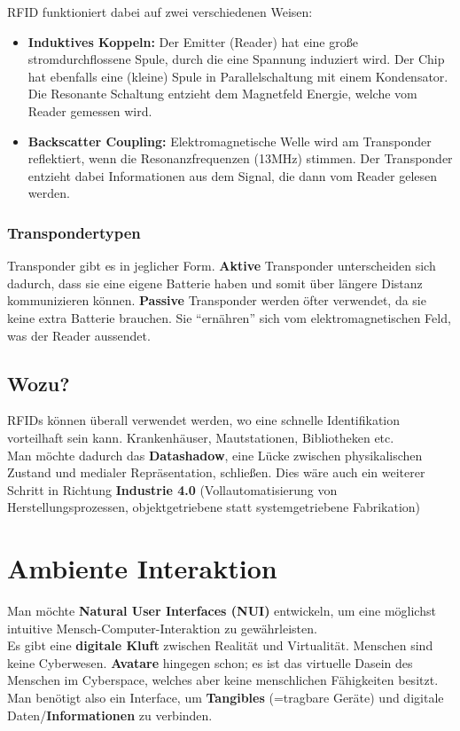 \documentclass[a4paper]{article}
\begin{document}
RFID funktioniert dabei auf zwei verschiedenen Weisen:
\begin{itemize}
	\item \textbf{Induktives Koppeln:} Der Emitter (Reader) hat eine große stromdurchflossene Spule, durch die eine Spannung induziert wird. Der Chip hat ebenfalls eine (kleine) Spule in Parallelschaltung mit einem Kondensator. Die Resonante Schaltung entzieht dem Magnetfeld Energie, welche vom Reader gemessen wird.
	\item \textbf{Backscatter Coupling:} Elektromagnetische Welle wird am Transponder reflektiert, wenn die Resonanzfrequenzen (13MHz) stimmen. Der Transponder entzieht dabei Informationen aus dem Signal, die dann vom Reader gelesen werden.
\end{itemize}

\subsubsection{Transpondertypen}
Transponder gibt es in jeglicher Form. \textbf{Aktive} Transponder unterscheiden sich dadurch, dass sie eine eigene Batterie haben und somit über längere Distanz kommunizieren können. \textbf{Passive} Transponder werden öfter verwendet, da sie keine extra Batterie brauchen. Sie ``ernähren'' sich vom elektromagnetischen Feld, was der Reader aussendet.

\subsection{Wozu?}
RFIDs können überall verwendet werden, wo eine schnelle Identifikation vorteilhaft sein kann. Krankenhäuser, Mautstationen, Bibliotheken etc.\\

Man möchte dadurch das \textbf{Datashadow}, eine Lücke zwischen physikalischen Zustand und medialer Repräsentation, schließen. Dies wäre auch ein weiterer Schritt in Richtung \textbf{Industrie 4.0} (Vollautomatisierung von Herstellungsprozessen, objektgetriebene statt systemgetriebene Fabrikation)

\newpage
\section{Ambiente Interaktion}
Man möchte \textbf{Natural User Interfaces (NUI)} entwickeln, um eine möglichst intuitive Mensch-Computer-Interaktion zu gewährleisten.\\
Es gibt eine \textbf{digitale Kluft} zwischen Realität und Virtualität. Menschen sind keine Cyberwesen. \textbf{Avatare} hingegen schon; es ist das virtuelle Dasein des Menschen im Cyberspace, welches aber keine menschlichen Fähigkeiten besitzt. Man benötigt also ein Interface, um \textbf{Tangibles} (=tragbare Geräte) und digitale Daten/\textbf{Informationen} zu verbinden.
\end{document}
